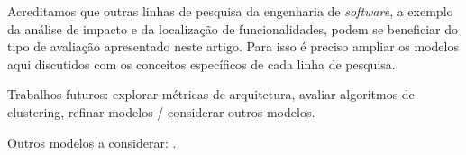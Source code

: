 \documentclass{acm_proc_article-sp}
\begin{document}
Acreditamos que outras linhas de pesquisa da engenharia de \emph{software}, a exemplo da análise de impacto e da localização de funcionalidades, podem se beneficiar do tipo de avaliação apresentado neste artigo. Para isso é preciso ampliar os modelos aqui discutidos com os conceitos específicos de cada linha de pesquisa.

Trabalhos futuros: explorar métricas de arquitetura, avaliar algoritmos de clustering, refinar modelos / considerar outros modelos.


Outros modelos a considerar: \cite{Lancichinetti2009,Chen2008}.

%


\end{document}
